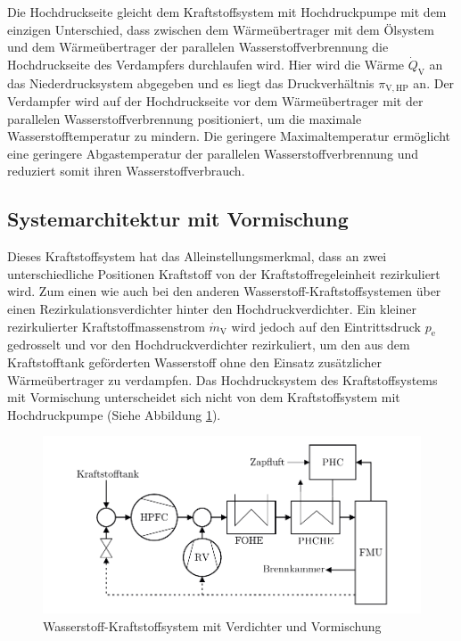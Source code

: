 Die Hochdruckseite gleicht dem Kraftstoffsystem mit Hochdruckpumpe mit dem einzigen Unterschied, dass zwischen dem Wärmeübertrager mit dem Ölsystem und dem Wärmeübertrager der parallelen Wasserstoffverbrennung die Hochdruckseite des Verdampfers durchlaufen wird. Hier wird die Wärme $\dot{Q}_\mathrm{V}$ an das Niederdrucksystem abgegeben und es liegt das Druckverhältnis $\pi_{\mathrm{V,HP}}$ an. Der Verdampfer wird auf der Hochdruckseite vor dem Wärmeübertrager mit der parallelen Wasserstoffverbrennung positioniert, um die maximale Wasserstofftemperatur zu mindern. Die geringere Maximaltemperatur ermöglicht eine geringere Abgastemperatur der parallelen Wasserstoffverbrennung und reduziert somit ihren Wasserstoffverbrauch.

\subsection{Systemarchitektur mit Vormischung}

Dieses Kraftstoffsystem hat das Alleinstellungsmerkmal, dass an zwei unterschiedliche Positionen Kraftstoff von der Kraftstoffregeleinheit rezirkuliert wird. Zum einen wie auch bei den anderen Wasserstoff-Kraftstoffsystemen über einen Rezirkulationsverdichter hinter den Hochdruckverdichter. Ein kleiner rezirkulierter Kraftstoffmassenstrom $\dot{m}_\mathrm{V}$ wird jedoch auf den Eintrittsdruck $p_\mathrm{e}$ gedrosselt und vor den Hochdruckverdichter rezirkuliert, um den aus dem Kraftstofftank geförderten Wasserstoff ohne den Einsatz zusätzlicher Wärmeübertrager zu verdampfen. Das Hochdrucksystem des Kraftstoffsystems mit Vormischung unterscheidet sich nicht von dem Kraftstoffsystem mit Hochdruckpumpe (Siehe Abbildung \ref{fig:vormischung}).

\begin{figure}[ht]
\centering
\includegraphics[width=1\linewidth]{4_Abbildungen/2_Hauptteil/Kraftstoffsystem Abbildungen/dual.pdf}
  \caption{Wasserstoff-Kraftstoffsystem mit Verdichter und Vormischung}
  \label{fig:vormischung}
\end{figure}
\FloatBarrier 

